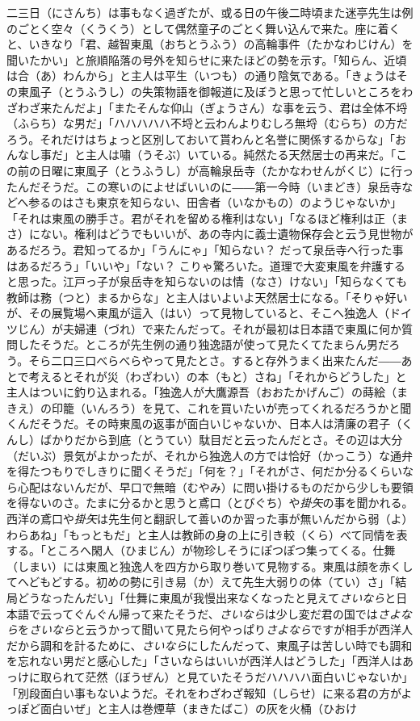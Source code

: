 \documentclass{book}
\begin{document}
二三日（にさんち）は事もなく過ぎたが、或る日の午後二時頃また迷亭先生は例のごとく空々（くうくう）として偶然童子のごとく舞い込んで来た。座に着くと、いきなり「君、越智東風（おちとうふう）の高輪事件（たかなわじけん）を聞いたかい」と旅順陥落の号外を知らせに来たほどの勢を示す。「知らん、近頃は合（あ）わんから」と主人は平生（いつも）の通り陰気である。「きょうはその東風子（とうふうし）の失策物語を御報道に及ぼうと思って忙しいところをわざわざ来たんだよ」「またそんな仰山（ぎょうさん）な事を云う、君は全体不埒（ふらち）な男だ」「ハハハハハ不埒と云わんよりむしろ無埒（むらち）の方だろう。それだけはちょっと区別しておいて貰わんと名誉に関係するからな」「おんなし事だ」と主人は嘯（うそぶ）いている。純然たる天然居士の再来だ。「この前の日曜に東風子（とうふうし）が高輪泉岳寺（たかなわせんがくじ）に行ったんだそうだ。この寒いのによせばいいのに――第一今時（いまどき）泉岳寺などへ参るのはさも東京を知らない、田舎者（いなかもの）のようじゃないか」「それは東風の勝手さ。君がそれを留める権利はない」「なるほど権利は正（まさ）にない。権利はどうでもいいが、あの寺内に義士遺物保存会と云う見世物があるだろう。君知ってるか」「うんにゃ」「知らない？ だって泉岳寺へ行った事はあるだろう」「いいや」「ない？ こりゃ驚ろいた。道理で大変東風を弁護すると思った。江戸っ子が泉岳寺を知らないのは情（なさ）けない」「知らなくても教師は務（つと）まるからな」と主人はいよいよ天然居士になる。「そりゃ好いが、その展覧場へ東風が這入（はい）って見物していると、そこへ独逸人（ドイツじん）が夫婦連（づれ）で来たんだって。それが最初は日本語で東風に何か質問したそうだ。ところが先生例の通り独逸語が使って見たくてたまらん男だろう。そら二口三口べらべらやって見たとさ。すると存外うまく出来たんだ――あとで考えるとそれが災（わざわい）の本（もと）さね」「それからどうした」と主人はついに釣り込まれる。「独逸人が大鷹源吾（おおたかげんご）の蒔絵（まきえ）の印籠（いんろう）を見て、これを買いたいが売ってくれるだろうかと聞くんだそうだ。その時東風の返事が面白いじゃないか、日本人は清廉の君子（くんし）ばかりだから到底（とうてい）駄目だと云ったんだとさ。その辺は大分（だいぶ）景気がよかったが、それから独逸人の方では恰好（かっこう）な通弁を得たつもりでしきりに聞くそうだ」「何を？」「それがさ、何だか分るくらいなら心配はないんだが、早口で無暗（むやみ）に問い掛けるものだから少しも要領を得ないのさ。たまに分るかと思うと鳶口（とびぐち）や\emph{掛矢}の事を聞かれる。西洋の鳶口や\emph{掛矢}は先生何と翻訳して善いのか習った事が無いんだから弱（よ）わらあね」「もっともだ」と主人は教師の身の上に引き較（くら）べて同情を表する。「ところへ閑人（ひまじん）が物珍しそうにぽつぽつ集ってくる。仕舞（しまい）には東風と独逸人を四方から取り巻いて見物する。東風は顔を赤くしてへどもどする。初めの勢に引き易（か）えて先生大弱りの体（てい）さ」「結局どうなったんだい」「仕舞に東風が我慢出来なくなったと見えて\emph{さいなら}と日本語で云ってぐんぐん帰って来たそうだ、\emph{さいなら}は少し変だ君の国では\emph{さよなら}を\emph{さいなら}と云うかって聞いて見たら何やっぱり\emph{さよなら}ですが相手が西洋人だから調和を計るために、\emph{さいなら}にしたんだって、東風子は苦しい時でも調和を忘れない男だと感心した」「さいならはいいが西洋人はどうした」「西洋人はあっけに取られて茫然（ぼうぜん）と見ていたそうだハハハハ面白いじゃないか」「別段面白い事もないようだ。それをわざわざ報知（しらせ）に来る君の方がよっぽど面白いぜ」と主人は巻煙草（まきたばこ）の灰を火桶（ひおけ
\end{document}
